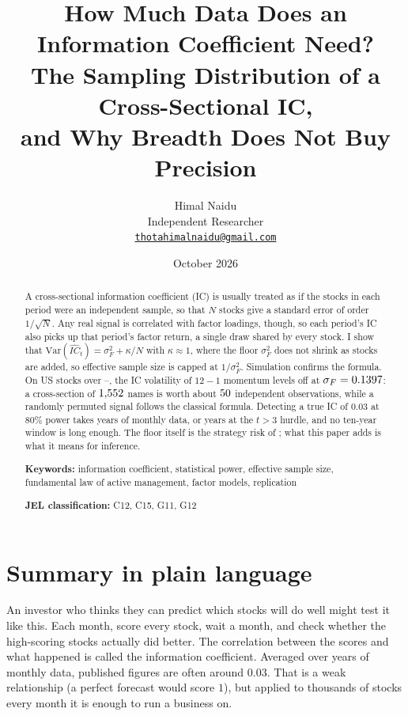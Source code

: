 \documentclass[11pt,a4paper]{article}
\title{\bfseries How Much Data Does an Information Coefficient Need?\\[0.35em]
\large The Sampling Distribution of a Cross-Sectional IC,\\ and Why Breadth Does Not Buy Precision}
\author{Himal Naidu\\[0.2em]
\normalsize Independent Researcher\\
\normalsize \href{mailto:thotahimalnaidu@gmail.com}{\texttt{thotahimalnaidu@gmail.com}}}
\date{October 2026}
\newcommand{\ICh}{\widehat{IC}}
\newcommand{\sF}{\sigma_F}
\begin{document}
\maketitle

\begin{abstract}
\noindent
A cross-sectional information coefficient (IC) is usually treated as if the stocks in
each period were an independent sample, so that $N$ stocks give a standard error of
order $1/\sqrt{N}$. Any real signal is correlated with factor loadings, though, so each
period's IC also picks up that period's factor return, a single draw shared by every
stock. I show that $\mathrm{Var}(\ICh_t) = \sF^2 + \kappa/N$ with $\kappa \approx 1$,
where the floor $\sF^2$ does not shrink as stocks are added, so effective sample size is
capped at $1/\sF^2$. Simulation confirms the formula. On \nTickers{} US stocks over
\panelStart{}--\panelEnd{}, the IC volatility of $12-1$ momentum levels off at
$\sF = \momFloor$: a cross-section of $1{,}552$ names is worth about $50$ independent
observations, while a randomly permuted signal follows the classical formula. Detecting
a true IC of $0.03$ at $80\%$ power takes \reqYsingle{} years of monthly data, or
\reqYhlz{} years at the $t>3$ hurdle, and no ten-year window is long enough. The floor
itself is the strategy risk of \citet{qian2004active}; what this paper adds is what it
means for inference.

\medskip
\noindent\textbf{Keywords:} information coefficient, statistical power, effective sample
size, fundamental law of active management, factor models, replication

\noindent\textbf{JEL classification:} C12, C15, G11, G12
\end{abstract}

\section{Summary in plain language}

An investor who thinks they can predict which stocks will do well might test it like
this. Each month, score every stock, wait a month, and check whether the high-scoring
stocks actually did better. The correlation between the scores and what happened is
called the information coefficient. Averaged over years of
monthly data, published figures are often around $0.03$. That is a weak relationship (a perfect forecast would score $1$), but
applied to thousands of stocks every month it is enough to run a business on.
\end{document}
